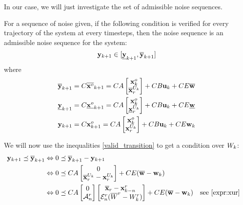 \documentclass{article}
\theoremstyle{named}
\begin{document}
In our case, we will just investigate the set of admissible noise sequences.

\newcommand{\ANoise}{\Omega}
\newcommand{\NoiseSet}{\mathcal{W}}
\newcommand{\infseq}{\omega}
\newcommand{\xa}{\x^a}

\newcommand{\sykn}{\msup{\y}_{k+1}}%
\newcommand{\iykn}{\minf{\y}_{k+1}}%
For a sequence of noise given, if the following condition is verified for every trajectory of the system at every timesteps, then the noise sequence is an admissible noise sequence for the system:
\begin{equation} \label{valid_transition}
\ykn \in [\iykn,\sykn]
\end{equation}
where 
\begin{align*}
\sykn &= C \msup{\xo}_{k+1} = 
C A 
\begin{bmatrix}
\xo_{k} \\
\xuks
\end{bmatrix}
+ C B \uk + C E \msup{\w}
\\
\iykn &= C \minf{\xo}_{k+1} 
= C A 
\begin{bmatrix}
\xo_{k} \\
\xuki
\end{bmatrix}
+ C B \uk + C E \minf{\w}
\\
\ykn &= C \xo_{k+1}
= C A 
\begin{bmatrix}
\xo_{k} \\
\xuk
\end{bmatrix}
+ C B \uk + C E \wk
\end{align*}

We will now use the inequalities \ref{valid_transition} to get a condition over $W_k$:
\begin{align*}
\ykn \mleq \sykn
& \Leftrightarrow
0 \mleq \sykn - \ykn \\
& \Leftrightarrow
0 \mleq
C A \begin{bmatrix} 0 \\ \xuks-\xuk \end{bmatrix}
+ C E (\msup{\w} -\wk)
\\
& \Leftrightarrow
0 \mleq
C A 
\begin{bmatrix} 0 \\ \An \end{bmatrix} 
\begin{bmatrix}
\xrsup - \xr_{k-n}\ \\
\En (\Wrsup - \Wrk)
\end{bmatrix}
+ C E (\msup{\w} -\wk)
&& \textrm{see \ref{expr:xur}}
\end{align*}
\end{document}
